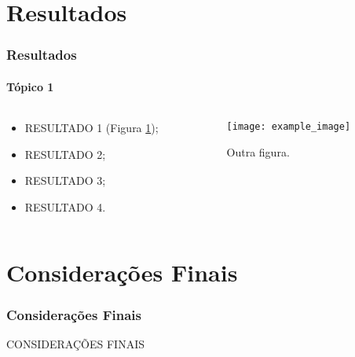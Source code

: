 \section{Resultados}

\begin{frame}
    \frametitle{Resultados}
    \framesubtitle{Tópico 1}
    
    \begin{columns}
        
        \begin{column}{0.5\textwidth}
            
            \begin{itemize}
                
                \item RESULTADO 1 (Figura \ref{fig:2});
                \item RESULTADO 2;
                \item RESULTADO 3;
                \item RESULTADO 4.
                
            \end{itemize}
        
        \end{column}
        
        \begin{column}{0.5\textwidth}
            
            \begin{figure}
        
                \centering
                \texttt{[image: example\_image]}
                \caption{Outra figura.}
                \label{fig:2}
        
            \end{figure}
        
        \end{column}
    
    \end{columns}
    
\end{frame}


\section{Considerações Finais}

\begin{frame}
    \frametitle{Considerações Finais}
    \center

    CONSIDERAÇÕES FINAIS

\end{frame}
    
